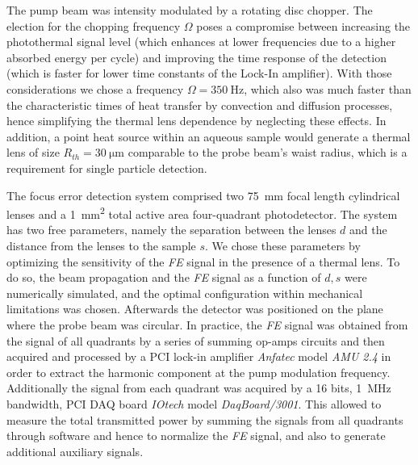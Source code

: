 \documentclass[9pt,twocolumn,twoside]{osajnl}
\newcommand{\FE}{\textit{FE}}
\begin{document}
The pump beam was intensity modulated by a rotating disc chopper. The election for the chopping frequency $\Omega$ poses a compromise between increasing the photothermal signal level (which enhances at lower frequencies due to a higher absorbed energy per cycle) and improving the time response of the detection (which is faster for lower time constants of the Lock-In amplifier). With those considerations we chose a frequency $\Omega = \SI{350}{\hertz}$, which also was much faster than the characteristic times of heat transfer by convection and diffusion processes, hence simplifying the thermal lens dependence by neglecting these effects. In addition, a point heat source within an aqueous sample would generate a thermal lens of size $R_{th} = \SI{30}{\micro\metre}$ comparable to the probe beam's waist radius, which is a requirement for single particle detection.



The focus error detection system comprised two \SI{75}{\milli\metre} focal length cylindrical lenses and a \SI{1}{\milli\metre^2} total active area four-quadrant photodetector. The system has two free parameters, namely the separation between the lenses $d$ and the distance from the lenses to the sample $s$. We chose these parameters by optimizing the sensitivity of the \FE{} signal in the presence of a thermal lens. To do so, the beam propagation and the \FE{} signal as a function of ${d,s}$ were numerically simulated, and the optimal configuration within mechanical limitations was chosen. Afterwards the detector was positioned on the plane where the probe beam was circular. In practice, the \FE{} signal was obtained from the signal of all quadrants by a series of summing op-amps circuits and then acquired and processed by a PCI lock-in amplifier \emph{Anfatec} model \emph{AMU 2.4} in order to extract the harmonic component at the pump modulation frequency. Additionally the signal from each quadrant was acquired by a 16 bits, \SI{1}{\mega\hertz} bandwidth, PCI DAQ board \emph{IOtech} model \emph{DaqBoard/3001}. This allowed to measure the total transmitted power by summing the signals from all quadrants through software and hence to normalize the \FE{} signal, and also to generate additional auxiliary signals. \\
\end{document}
